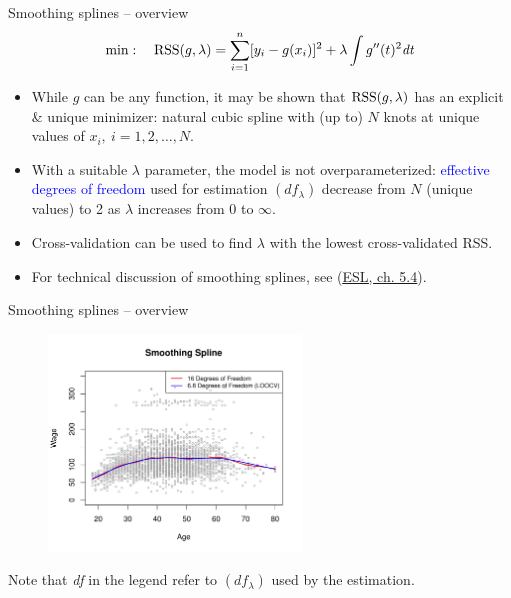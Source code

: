 \documentclass{beamer}
\begin{document}
\begin{frame}{Smoothing splines -- overview}
$$\min:~~~\textnormal{RSS}(g,\lambda) = \sum_{i=1}^n [y_i - g(x_i)]^2 + \lambda \int g''(t)^2 \textit{dt}$$
\begin{itemize}
    \item While $g$ can be any function, it may be shown that $\textnormal{RSS}(g,\lambda)$ has an explicit \& unique minimizer: natural cubic spline with (up to) $N$ knots at unique values of $x_i,~i=1,2,\dots,N$.
    \medskip
    \item With a suitable $\lambda$ parameter, the model is not overparameterized: \textcolor{blue}{effective degrees of freedom} used for estimation $(df_{\lambda})$ decrease from $N$ (unique values) to 2 as $\lambda$ increases from 0 to $\infty$.
    \medskip
    \item Cross-validation can be used to find $\lambda$ with the lowest cross-validated RSS.
    \medskip
    \item For technical discussion of smoothing splines, see (\textcolor{blue}{\underline{\href{https://web.stanford.edu/~hastie/ElemStatLearn/}{ESL, ch. 5.4}}}).
\end{itemize}
\end{frame}
\begin{frame}{Smoothing splines -- overview}
\vspace{-0.4cm}
\begin{figure}
  \centering
  \includegraphics[trim=0cm 0cm 0cm 1cm, clip=true, width=0.6\textwidth]{IMG/ISLR78.pdf}
\end{figure}
\centering
\vspace{-0.5cm}
\tiny{Note that \textit{df} in the legend refer to $(df_{\lambda})$ used by the estimation.}
\end{frame}
\end{document}

